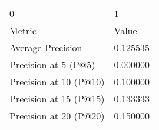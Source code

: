 \begin{tabular}{ll}
0 & 1 \\
Metric & Value \\
Average Precision & 0.125535 \\
Precision at 5 (P@5) & 0.000000 \\
Precision at 10 (P@10) & 0.100000 \\
Precision at 15 (P@15) & 0.133333 \\
Precision at 20 (P@20) & 0.150000 \\
\end{tabular}
